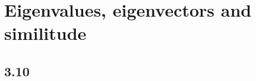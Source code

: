\section{Eigenvalues, eigenvectors and similitude}
\nosolution

\nosolution

\nosolution

\nosolution

\nosolution

\nosolution

\nosolution

\nosolution

\nosolution

\subsection*{3.10}
\nosolution
